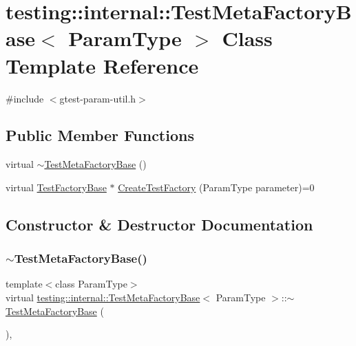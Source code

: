 \hypertarget{classtesting_1_1internal_1_1TestMetaFactoryBase}{}\section{testing\+::internal\+::Test\+Meta\+Factory\+Base$<$ Param\+Type $>$ Class Template Reference}
\label{classtesting_1_1internal_1_1TestMetaFactoryBase}


{\ttfamily \#include $<$gtest-\/param-\/util.\+h$>$}

\subsection*{Public Member Functions}
\begin{DoxyCompactItemize}
\item 
virtual \mbox{\hyperlink{classtesting_1_1internal_1_1TestMetaFactoryBase_aad80adf04686f7dfcf952e44afc02767}{$\sim$\+Test\+Meta\+Factory\+Base}} ()
\item 
virtual \mbox{\hyperlink{classtesting_1_1internal_1_1TestFactoryBase}{Test\+Factory\+Base}} $\ast$ \mbox{\hyperlink{classtesting_1_1internal_1_1TestMetaFactoryBase_a853daab362740bcac55e180128d564ef}{Create\+Test\+Factory}} (Param\+Type parameter)=0
\end{DoxyCompactItemize}


\subsection{Constructor \& Destructor Documentation}
\mbox{\label{classtesting_1_1internal_1_1TestMetaFactoryBase_aad80adf04686f7dfcf952e44afc02767}} 
\subsubsection{\texorpdfstring{$\sim$TestMetaFactoryBase()}{~TestMetaFactoryBase()}}
{\footnotesize\ttfamily template$<$class Param\+Type$>$ \\
virtual \mbox{\hyperlink{classtesting_1_1internal_1_1TestMetaFactoryBase}{testing\+::internal\+::\+Test\+Meta\+Factory\+Base}}$<$ Param\+Type $>$\+::$\sim$\mbox{\hyperlink{classtesting_1_1internal_1_1TestMetaFactoryBase}{Test\+Meta\+Factory\+Base}} (\begin{DoxyParamCaption}{ }\end{DoxyParamCaption})\hspace{0.3cm}{\ttfamily [inline]}, {\ttfamily [virtual]}}



